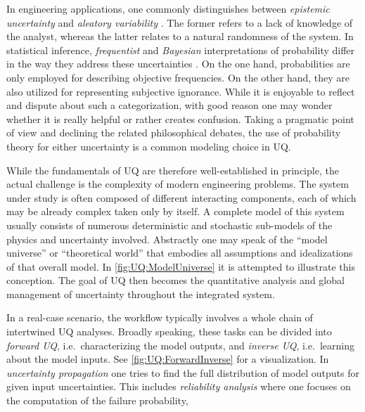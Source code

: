 \par %
In engineering applications, one commonly distinguishes between \emph{epistemic uncertainty} and \emph{aleatory variability} \cite{Uncertainty:Ayyub2006}.
The former refers to a lack of knowledge of the analyst, whereas the latter relates to a natural randomness of the system.
In statistical inference, \emph{frequentist} and \emph{Bayesian} interpretations of probability
differ in the way they address these uncertainties \cite{Statistics:Barnett1999,Statistics:Cox2006,Statistics:Samaniego2010}.
On the one hand, probabilities are only employed for describing objective frequencies.
On the other hand, they are also utilized for representing subjective ignorance.
While it is enjoyable to reflect and dispute about such a categorization, with good reason one may wonder whether it is really helpful or rather creates confusion.
Taking a pragmatic point of view and declining the related philosophical debates, the use of probability theory for either uncertainty is a common modeling choice in UQ.
\par %
While the fundamentals of UQ are therefore well-established in principle, the actual challenge is the complexity of modern engineering problems.
The system under study is often composed of different interacting components, each of which may be already complex taken only by itself.
A complete model of this system usually consists of numerous deterministic and stochastic sub-models of the physics and uncertainty involved.
Abstractly one may speak of the ``model universe'' \cite{Uncertainty:Kiureghian2009} or ``theoretical world'' \cite{Statistics:Kass2011}
that embodies all assumptions and idealizations of that overall model.
In \cref{fig:UQ:ModelUniverse} it is attempted to illustrate this conception.
The goal of UQ then becomes the quantitative analysis and global management of uncertainty throughout the integrated system.
\par %
In a real-case scenario, the workflow typically involves a whole chain of intertwined UQ analyses.
Broadly speaking, these tasks can be divided into \emph{forward UQ}, i.e.\ characterizing the model outputs, and \emph{inverse UQ}, i.e.\ learning about the model inputs.
See \cref{fig:UQ:ForwardInverse} for a visualization.
In \emph{uncertainty propagation} \cite{Probability:Grigoriu2002,Probability:Grigoriu2012} one tries to find the full distribution of model outputs for given input uncertainties.
This includes \emph{reliability analysis} \cite{Uncertainty:Lemaire2009,Uncertainty:Nowak2013} where one focuses on the computation of the failure probability,
